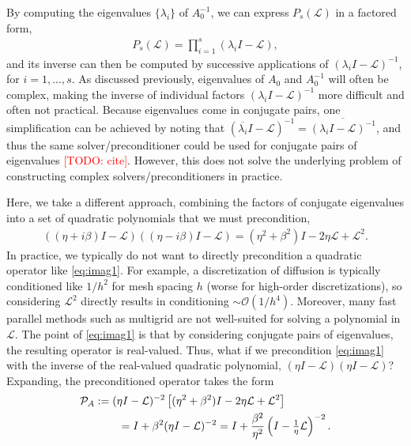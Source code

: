 \documentclass[a4paper,10pt]{article}
\makeatletter
\newcommand{\todo}[1]{\textcolor{red}{[TODO\@: #1]}}
\makeatother
\begin{document}
By computing the eigenvalues $\{\lambda_i\}$ of $A_0^{-1}$, we can express
$P_s(\mathcal{L})$ in a factored form, 
%
\begin{align}\label{eq:fac}
P_s(\mathcal{L}) = \prod_{i=1}^s (\lambda_i I - \mathcal{L}),
\end{align}
%
and its inverse can then be computed by successive applications of $(\lambda_iI - \mathcal{L})^{-1}$,
for $i=1,...,s$. As discussed previously, eigenvalues of $A_0$ and $A_0^{-1}$ will often be
complex, making the inverse of individual factors $(\lambda_iI - \mathcal{L})^{-1}$ more
difficult and often not practical. Because eigenvalues come in conjugate pairs, one simplification
can be achieved by noting that $(\overline{\lambda_i}I - \mathcal{L})^{-1}
= \overline{(\lambda_iI - \mathcal{L})^{-1}}$, and thus the same solver/preconditioner
could be used for conjugate pairs of eigenvalues \todo{cite}. However, this does not
solve the underlying problem of constructing complex solvers/preconditioners in
practice. 

Here, we take a different approach, combining the factors of conjugate eigenvalues
into a set of quadratic polynomials that we must precondition,
%
\begin{align}\label{eq:imag1}
((\eta + i\beta)I - \mathcal{L})((\eta - i\beta)I - \mathcal{L}) =
	(\eta^2+\beta^2)I - 2\eta \mathcal{L} + \mathcal{L}^2.
\end{align}
%
In practice, we typically do not want to directly precondition a quadratic operator
like \eqref{eq:imag1}. For example, a discretization of diffusion is typically 
conditioned like $1/h^2$ for mesh spacing $h$ (worse for high-order discretizations),
so considering $\mathcal{L}^2$ directly results in conditioning $\sim\mathcal{O}(1/h^4)$.
Moreover, many fast parallel methods such as multigrid are not well-suited for solving
a polynomial in $\mathcal{L}$. The point of \eqref{eq:imag1} is that by considering
conjugate pairs of eigenvalues, the resulting operator is real-valued. Thus, what if
we precondition \eqref{eq:imag1} with the inverse of the real-valued quadratic polynomial,
$(\eta I - \mathcal{L})(\eta I - \mathcal{L})$? Expanding, the preconditioned operator
takes the form
%
\begin{align}\nonumber
\mathcal{P}_A & := (\eta I - \mathcal{L})^{-2}\left[(\eta^2+\beta^2)I - 2\eta \mathcal{L} + \mathcal{L}^2\right] \\
&\hspace{5ex} = I + \beta^2(\eta I - \mathcal{L})^{-2}
= I + \frac{\beta^2}{\eta^2}\left(I - \tfrac{1}{\eta}\mathcal{L}\right)^{-2}.\label{eq:prec1}
\end{align}
%
\end{document}
